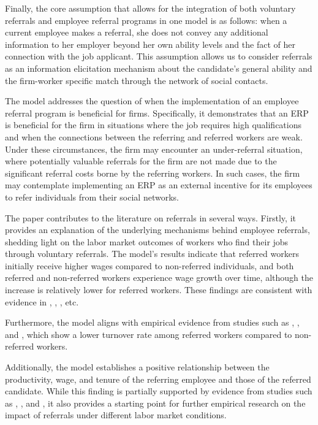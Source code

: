 \documentclass[12pt]{article}
\begin{document}
Finally, the core assumption that allows for the integration of both voluntary referrals and employee referral programs in one model is as follows: when a current employee makes a referral, she does not convey any additional information to her employer beyond her own ability levels and the fact of her connection with the job applicant. This assumption allows us to consider referrals as an information elicitation mechanism about the candidate's general ability and the firm-worker specific match through the network of social contacts.

The model addresses the question of when the implementation of an employee referral program is beneficial for firms. Specifically, it demonstrates that an ERP is beneficial for the firm in situations where the job requires high qualifications and when the connections between the referring and referred workers are weak. Under these circumstances, the firm may encounter an under-referral situation, where potentially valuable referrals for the firm are not made due to the significant referral costs borne by the referring workers. In such cases, the firm may contemplate implementing an ERP as an external incentive for its employees to refer individuals from their social networks.

The paper contributes to the literature on referrals in several ways. Firstly, it provides an explanation of the underlying mechanisms behind employee referrals, shedding light on the labor market outcomes of workers who find their jobs through voluntary referrals. The model's results indicate that referred workers initially receive higher wages compared to non-referred individuals, and both referred and non-referred workers experience wage growth over time, although the increase is relatively lower for referred workers. These findings are consistent with evidence in \cite{corcoran1980most}, \cite{montgomery1991social}, \cite{dustmann2016referral}, etc.

Furthermore, the model aligns with empirical evidence from studies such as \cite{pallais2016referential}, \cite{lalanne2016old}, and \cite{lalanne2021social}, which show a lower turnover rate among referred workers compared to non-referred workers.

Additionally, the model establishes a positive relationship between the productivity, wage, and tenure of the referring employee and those of the referred candidate. While this finding is partially supported by evidence from studies such as \cite{kugler2003employee}, \cite{lalanne2016old}, and \cite{levati2020impact}, it also provides a starting point for further empirical research on the impact of referrals under different labor market conditions.
\end{document}
